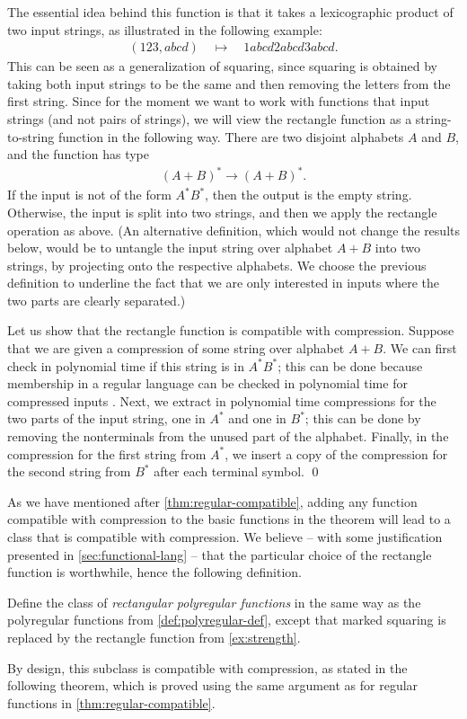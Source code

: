 \documentclass[a4paper,UKenglish,cleveref, autoref, thm-restate]{lipics-v2021}
\begin{document}
\begin{example}[rectangle] \label{ex:strength}  The essential idea behind this function is that it takes a lexicographic product of two input strings, as illustrated in the following example:
    \begin{align}
        \label{eq:rectangle}
    (123,abcd) \quad \mapsto \quad 1abcd2abcd3abcd.
    \end{align}
    This can be seen as a generalization of squaring, since squaring is obtained by taking both input strings to be the same and then removing the letters from the first string.
Since for the moment we want to work with functions that input strings (and not pairs of strings), we will view the  rectangle function as a string-to-string function in the following way. There are two disjoint alphabets $A$ and $B$, and the function has  type 
    \begin{align*}
    (A+B)^* \to (A+B)^*.
    \end{align*}
If the input is not of the form $A^*B^*$, then the output is the empty string. Otherwise, the input is split into two strings, and then we apply the rectangle operation as above. (An alternative definition, which would not change the results below, would be to untangle the input string over alphabet $A+B$ into two strings, by projecting onto the respective alphabets. We choose the previous definition to underline the fact that we are only interested in inputs where the two parts are clearly separated.)

    Let us show that the rectangle function is compatible with compression. Suppose that we are given a compression of some string over alphabet $A+B$. We can first check in polynomial time if this string is in $A^*B^*$; this can be done  because membership in a regular language can be checked in polynomial time for compressed inputs \cite{PlandowskiR99}. Next, we extract in polynomial time compressions for the two parts of the input string, one in $A^*$ and one in $B^*$; this can be done by removing the nonterminals from the unused part of the alphabet.  Finally, in the compression for the first  string from $A^*$, we insert a copy of the compression for the second string from $B^*$ after each terminal symbol. 
    \qed
\end{example}
As we have mentioned after \cref{thm:regular-compatible}, adding any function compatible with compression to the basic functions in the theorem will lead to a class that is compatible with compression. We believe -- with some justification presented in \cref{sec:functional-lang} --  that the particular choice of the rectangle function is worthwhile, hence the following definition. 
\begin{definition}\label{def:rectangular-polyregular}
    Define the class of \emph{rectangular polyregular functions} in the same way as the polyregular functions from \cref{def:polyregular-def}, except that marked squaring is replaced by the rectangle function from \cref{ex:strength}.
\end{definition}
By design, this subclass is compatible with compression, as stated in the following theorem, which is proved using the same argument as for regular functions in \cref{thm:regular-compatible}.
\end{document}
